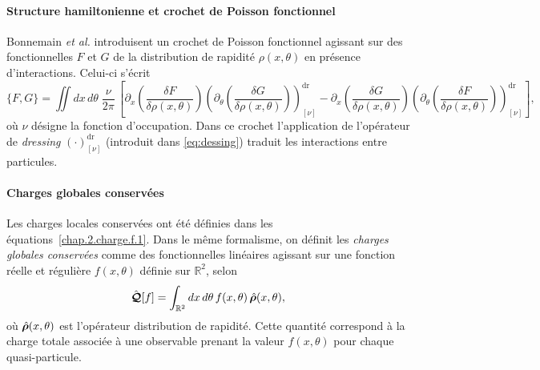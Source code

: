 \paragraph{Structure hamiltonienne et crochet de Poisson fonctionnel}  
Bonnemain \emph{et al.} \cite{bonnemain2024hamiltonian} introduisent un crochet de Poisson fonctionnel agissant sur des fonctionnelles $F$ et $G$ de la distribution de rapidité $\rho(x,\theta)$ en présence d’interactions. Celui-ci s’écrit
\begin{equation}\label{chap:GHD:eq.chochet.bonnemain.1}
	\{F,G\}
	=\iint dx\,d\theta\;\frac{\nu}{2\pi}\,
	\left[
		\partial_x \left( \frac{\delta F}{\delta \rho(x,\theta)} \right)
		\left( \partial_\theta \left( \frac{\delta G}{\delta \rho(x,\theta)} \right) \right)^{\mathrm{dr}}_{[\nu]}
		-
		\partial_x \left( \frac{\delta G}{\delta \rho(x,\theta)} \right)
		\left( \partial_\theta \left( \frac{\delta F}{\delta \rho(x,\theta)} \right) \right)^{\mathrm{dr}}_{[\nu]}
	\right],
\end{equation}
où $\nu$ désigne la fonction d’occupation. Dans ce crochet l'application de l’opérateur de \emph{dressing} $(\cdot)^{\mathrm{dr}}_{[\nu]}$ (introduit dans \eqref{eq:dessing})  traduit les interactions entre particules.


\medskip

\paragraph{Charges globales conservées}  
Les charges locales conservées ont été définies dans les équations~\eqref{chap.2.charge.f.1}.  
Dans le même formalisme, on définit les \emph{charges globales conservées} comme des fonctionnelles linéaires agissant sur une fonction réelle et régulière $f(x,\theta)$ définie sur $\mathbb{R}^2$, selon
\begin{equation}\label{chap:GHD:eq.charge.global.1}
	\hat{\bm{\mathcal{Q}}}[f] 
	= \int_{\mathbb{R}^2} dx\, d\theta\, f(x, \theta)\, \hat{\bm{\rho}}(x, \theta),
\end{equation}
où $\hat{\bm{\rho}}(x,\theta)$ est l'opérateur distribution de rapidité.  
Cette quantité correspond à la charge totale associée à une observable prenant la valeur $f(x,\theta)$ pour chaque quasi-particule.

